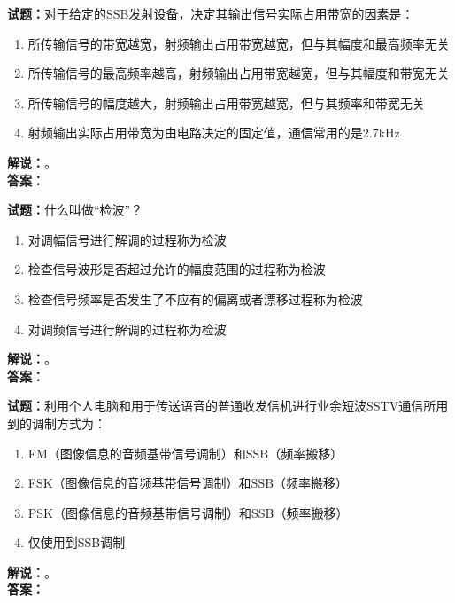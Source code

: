 \documentclass{ctexbook}
\begin{document}
\vspace{\baselineskip}

\noindent\textbf{试题：}对于给定的SSB发射设备，决定其输出信号实际占用带宽的因素是：
\begin{enumerate}[leftmargin=3em]
  \item 所传输信号的带宽越宽，射频输出占用带宽越宽，但与其幅度和最高频率无关
  \item 所传输信号的最高频率越高，射频输出占用带宽越宽，但与其幅度和带宽无关
  \item 所传输信号的幅度越大，射频输出占用带宽越宽，但与其频率和带宽无关
  \item 射频输出实际占用带宽为由电路决定的固定值，通信常用的是2.7\unit{\kHz}
\end{enumerate}
\noindent\textbf{解说：}\textbf{}。\\\noindent\textbf{答案：}

\vspace{\baselineskip}

\noindent\textbf{试题：}什么叫做“检波”？
\begin{enumerate}[leftmargin=3em]
  \item 对调幅信号进行解调的过程称为检波
  \item 检查信号波形是否超过允许的幅度范围的过程称为检波
  \item 检查信号频率是否发生了不应有的偏离或者漂移过程称为检波
  \item 对调频信号进行解调的过程称为检波
\end{enumerate}
\noindent\textbf{解说：}\textbf{}。\\\noindent\textbf{答案：}

\vspace{\baselineskip}

\noindent\textbf{试题：}利用个人电脑和用于传送语音的普通收发信机进行业余短波SSTV通信所用到的调制方式为：
\begin{enumerate}[leftmargin=3em]
  \item FM（图像信息的音频基带信号调制）和SSB（频率搬移）
  \item FSK（图像信息的音频基带信号调制）和SSB（频率搬移）
  \item PSK（图像信息的音频基带信号调制）和SSB（频率搬移）
  \item 仅使用到SSB调制
\end{enumerate}
\noindent\textbf{解说：}\textbf{}。\\\noindent\textbf{答案：}

\vspace{\baselineskip}
\end{document}
